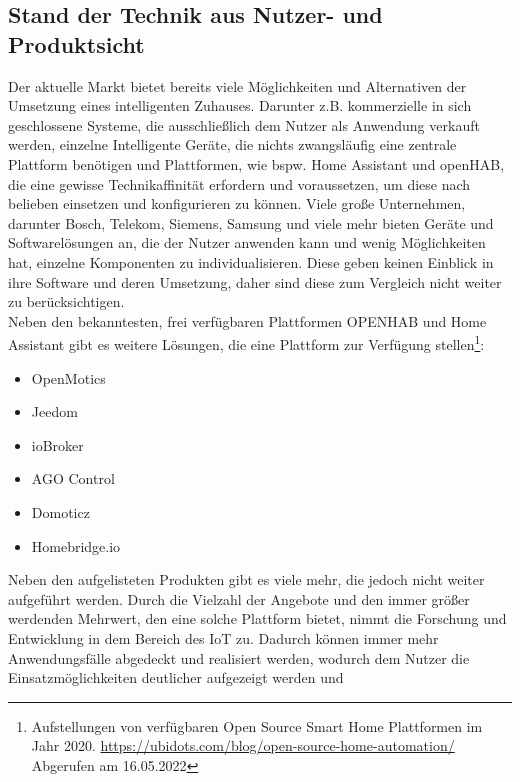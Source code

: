     \subsection{Stand der Technik aus Nutzer- und Produktsicht}
        Der aktuelle Markt bietet bereits viele Möglichkeiten und Alternativen der Umsetzung eines intelligenten Zuhauses. 
        Darunter z.B. kommerzielle in sich geschlossene Systeme, die ausschließlich dem Nutzer als Anwendung verkauft werden, 
        einzelne Intelligente Geräte, die nichts zwangsläufig eine zentrale Plattform benötigen und Plattformen, wie bspw. 
        Home Assistant und openHAB, die eine gewisse Technikaffinität erfordern und voraussetzen, um diese nach belieben 
        einsetzen und konfigurieren zu können. Viele große Unternehmen, darunter Bosch, Telekom, Siemens, Samsung und viele mehr bieten Geräte 
        und Softwarelösungen an, die der Nutzer anwenden kann und wenig Möglichkeiten hat, einzelne Komponenten zu individualisieren. 
        Diese geben keinen Einblick in ihre Software 
        und deren Umsetzung, daher sind diese zum Vergleich nicht weiter zu berücksichtigen. 
        \\
        \linebreak
        Neben den bekanntesten, frei verfügbaren Plattformen \acs{OPENHAB} und Home Assistant gibt es weitere Lösungen, die eine 
        Plattform zur Verfügung stellen\footnote{Aufstellungen von verfügbaren Open Source Smart Home Plattformen im Jahr 2020. \url{https://ubidots.com/blog/open-source-home-automation/} Abgerufen am 16.05.2022}:
        \begin{itemize}
            \item OpenMotics
            \item Jeedom
            \item ioBroker
            \item AGO Control 
            \item Domoticz
            \item Homebridge.io
        \end{itemize}
        Neben den aufgelisteten Produkten gibt es viele mehr, die jedoch nicht weiter aufgeführt werden. 
        Durch die Vielzahl der Angebote und den immer größer werdenden Mehrwert, den eine solche Plattform bietet, 
        nimmt die Forschung und Entwicklung in dem Bereich des \acs{IoT} zu. Dadurch können immer mehr 
        Anwendungsfälle abgedeckt und realisiert werden, wodurch dem Nutzer die Einsatzmöglichkeiten deutlicher aufgezeigt werden und 
